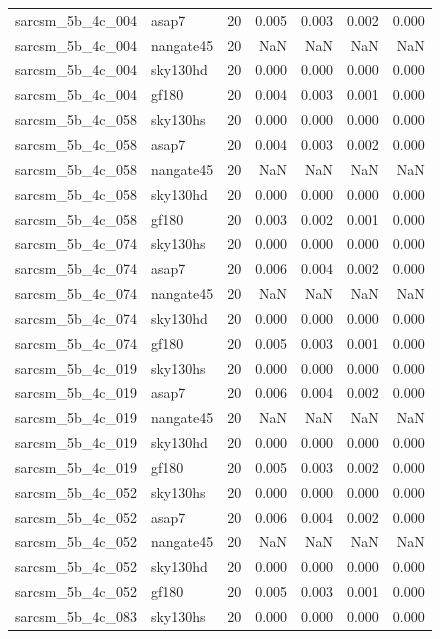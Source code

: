 \begin{tabular}{llrrrrr}
sarcsm\_5b\_4c\_004 & asap7 & 20 & 0.005 & 0.003 & 0.002 & 0.000 \\
sarcsm\_5b\_4c\_004 & nangate45 & 20 & NaN & NaN & NaN & NaN \\
sarcsm\_5b\_4c\_004 & sky130hd & 20 & 0.000 & 0.000 & 0.000 & 0.000 \\
sarcsm\_5b\_4c\_004 & gf180 & 20 & 0.004 & 0.003 & 0.001 & 0.000 \\
sarcsm\_5b\_4c\_058 & sky130hs & 20 & 0.000 & 0.000 & 0.000 & 0.000 \\
sarcsm\_5b\_4c\_058 & asap7 & 20 & 0.004 & 0.003 & 0.002 & 0.000 \\
sarcsm\_5b\_4c\_058 & nangate45 & 20 & NaN & NaN & NaN & NaN \\
sarcsm\_5b\_4c\_058 & sky130hd & 20 & 0.000 & 0.000 & 0.000 & 0.000 \\
sarcsm\_5b\_4c\_058 & gf180 & 20 & 0.003 & 0.002 & 0.001 & 0.000 \\
sarcsm\_5b\_4c\_074 & sky130hs & 20 & 0.000 & 0.000 & 0.000 & 0.000 \\
sarcsm\_5b\_4c\_074 & asap7 & 20 & 0.006 & 0.004 & 0.002 & 0.000 \\
sarcsm\_5b\_4c\_074 & nangate45 & 20 & NaN & NaN & NaN & NaN \\
sarcsm\_5b\_4c\_074 & sky130hd & 20 & 0.000 & 0.000 & 0.000 & 0.000 \\
sarcsm\_5b\_4c\_074 & gf180 & 20 & 0.005 & 0.003 & 0.001 & 0.000 \\
sarcsm\_5b\_4c\_019 & sky130hs & 20 & 0.000 & 0.000 & 0.000 & 0.000 \\
sarcsm\_5b\_4c\_019 & asap7 & 20 & 0.006 & 0.004 & 0.002 & 0.000 \\
sarcsm\_5b\_4c\_019 & nangate45 & 20 & NaN & NaN & NaN & NaN \\
sarcsm\_5b\_4c\_019 & sky130hd & 20 & 0.000 & 0.000 & 0.000 & 0.000 \\
sarcsm\_5b\_4c\_019 & gf180 & 20 & 0.005 & 0.003 & 0.002 & 0.000 \\
sarcsm\_5b\_4c\_052 & sky130hs & 20 & 0.000 & 0.000 & 0.000 & 0.000 \\
sarcsm\_5b\_4c\_052 & asap7 & 20 & 0.006 & 0.004 & 0.002 & 0.000 \\
sarcsm\_5b\_4c\_052 & nangate45 & 20 & NaN & NaN & NaN & NaN \\
sarcsm\_5b\_4c\_052 & sky130hd & 20 & 0.000 & 0.000 & 0.000 & 0.000 \\
sarcsm\_5b\_4c\_052 & gf180 & 20 & 0.005 & 0.003 & 0.001 & 0.000 \\
sarcsm\_5b\_4c\_083 & sky130hs & 20 & 0.000 & 0.000 & 0.000 & 0.000 \\

\end{tabular}
